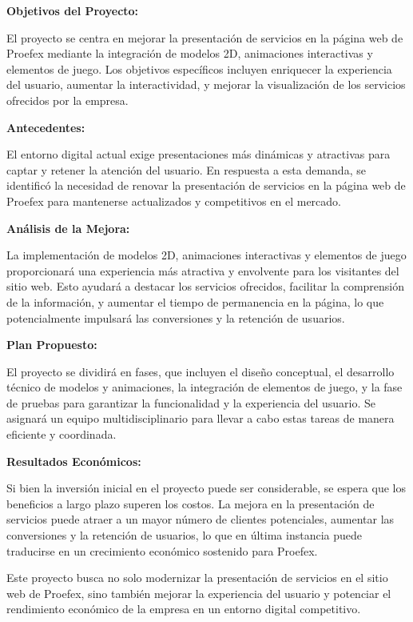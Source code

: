 \begin{resumen}

\textbf{Objetivos del Proyecto:}

El proyecto se centra en mejorar la presentación de servicios en la página web de Proefex mediante la integración de modelos 2D, animaciones interactivas y elementos de juego. Los objetivos específicos incluyen enriquecer la experiencia del usuario, aumentar la interactividad, y mejorar la visualización de los servicios ofrecidos por la empresa.

\textbf{Antecedentes:}

El entorno digital actual exige presentaciones más dinámicas y atractivas para captar y retener la atención del usuario. En respuesta a esta demanda, se identificó la necesidad de renovar la presentación de servicios en la página web de Proefex para mantenerse actualizados y competitivos en el mercado.

\textbf{Análisis de la Mejora:}

La implementación de modelos 2D, animaciones interactivas y elementos de juego proporcionará una experiencia más atractiva y envolvente para los visitantes del sitio web. Esto ayudará a destacar los servicios ofrecidos, facilitar la comprensión de la información, y aumentar el tiempo de permanencia en la página, lo que potencialmente impulsará las conversiones y la retención de usuarios.

\textbf{Plan Propuesto:}

El proyecto se dividirá en fases, que incluyen el diseño conceptual, el desarrollo técnico de modelos y animaciones, la integración de elementos de juego, y la fase de pruebas para garantizar la funcionalidad y la experiencia del usuario. Se asignará un equipo multidisciplinario para llevar a cabo estas tareas de manera eficiente y coordinada.

\textbf{Resultados Económicos:}

Si bien la inversión inicial en el proyecto puede ser considerable, se espera que los beneficios a largo plazo superen los costos. La mejora en la presentación de servicios puede atraer a un mayor número de clientes potenciales, aumentar las conversiones y la retención de usuarios, lo que en última instancia puede traducirse en un crecimiento económico sostenido para Proefex.

Este proyecto busca no solo modernizar la presentación de servicios en el sitio web de Proefex, sino también mejorar la experiencia del usuario y potenciar el rendimiento económico de la empresa en un entorno digital competitivo.
\end{resumen}

